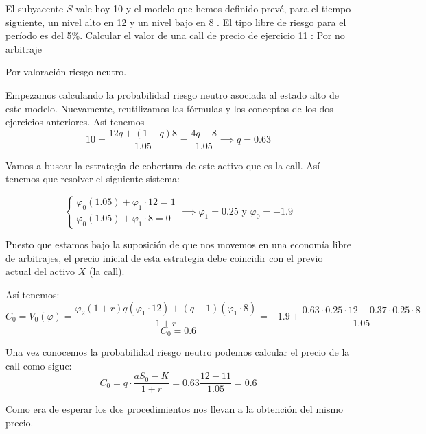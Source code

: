 \begin{problem}[3]
El subyacente $S$ vale hoy 10 \texteuro y el modelo que hemos definido prevé, para el tiempo siguiente, un nivel alto en 12 \texteuro y un nivel bajo en 8 \texteuro. El tipo libre de riesgo para el período es del 5\%. Calcular el valor de una call de precio de ejercicio 11 \texteuro:
\ppart Por no arbitraje

\ppart Por valoración riesgo neutro.
\solution

Empezamos calculando la probabilidad riesgo neutro asociada al estado alto de este modelo. Nuevamente, reutilizamos las fórmulas y los conceptos de los dos ejercicios anteriores. Así tenemos
\[10 = \frac{12q + (1-q)8}{1.05} = \frac{4q+8}{1.05} \implies q=0.63\]

\spart

Vamos a buscar la estrategia de cobertura de este activo que es la call. Así tenemos que resolver el siguiente sistema:

\[\left\{ \begin{array}{l}
\varphi_0(1.05) + \varphi_1\cdot 12 = 1 \\
\varphi_0(1.05) + \varphi_1\cdot 8 = 0
\end{array}\right. \implies \varphi_1 = 0.25 \text{ y } \varphi_0 = -1.9\]

Puesto que estamos bajo la suposición de que nos movemos en una economía libre de arbitrajes, el precio inicial de esta estrategia debe coincidir con el previo actual del activo $X$ (la call).

Así tenemos:
\[C_0 = V_0(\varphi) = \frac{\varphi_2(1+r) q(\varphi_1 \cdot 12) + (q-1)(\varphi_1\cdot 8)}{1+r} = -1.9 + \frac{0.63 \cdot 0.25\cdot 12 + 0.37 \cdot 0.25 \cdot 8}{1.05}\]
\[C_0 = 0.6\]
\spart

Una vez conocemos la probabilidad riesgo neutro podemos calcular el precio de la call como sigue:
\[C_0 = q\cdot \frac{aS_0 - K}{1+r} = 0.63 \frac{12-11}{1.05} = 0.6\]

Como era de esperar los dos procedimientos nos llevan a la obtención del mismo precio.
\end{problem}